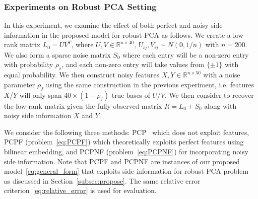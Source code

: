 \documentclass[twoside,11pt]{article}
\def\R{\mathbb{R}}
\def\realL{L_0}
\def\realS{S_0}
\begin{document}
\subsubsection{Experiments on Robust PCA Setting}
In this experiment, we examine the effect of both perfect and noisy side information
in the proposed model for robust PCA as follows.
We create a low-rank matrix $\realL = UV^T$, where
$U, V\in\R^{n\times 40}$, $U_{ij}, V_{ij} \sim N(0, 1/n)$
with $n =200$.  %
We also form a sparse noise matrix $\realS$ where each entry will be a non-zero entry
with probability $\rho_s$, and each non-zero entry will take values from $\{\pm1\}$ with
equal probability.
We then construct noisy features
$X, Y\in \R^{n\times 50}$ with a noise parameter
$\rho_f$ using the same construction in the previous experiment,
i.e. features $X$/$Y$ will only span $40\times (1-\rho_f)$ true bases of $U$/$V$.
We then consider to recover the low-rank matrix given the fully observed matrix $R = \realL+\realS$
along with noisy side information $X$ and $Y$.

We consider the following three methods: PCP~\citep{Candes11a} which does not exploit features,
PCPF (problem~\ref{eq:PCPF}) which theoretically exploits perfect features
using bilinear embedding, and PCPNF
(problem~\ref{eq:PCPNF}) for incorporating noisy side information.
Note that PCPF and PCPNF
are instances of our proposed model~\eqref{eq:general_form} that exploits side information
for robust PCA problem as discussed in Section~\ref{subsec:propose}.
The same relative error criterion~\eqref{eq:relative_error} is used for evaluation.
\end{document}
